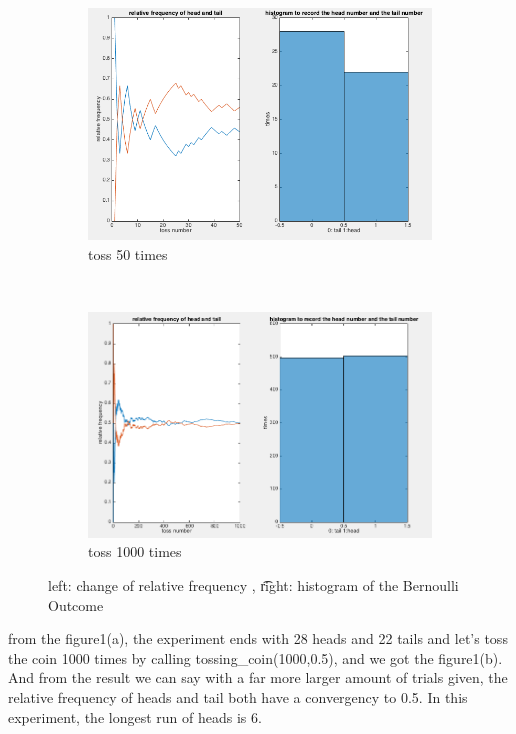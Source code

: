 \documentclass[twoside]{article}
\begin{document}
\begin{figure}[H]%
   \centering
   \begin{subfigure}[b]{0.47\textwidth}
   \includegraphics[width=\textwidth]{../data/exp1.png} 
   \caption{toss 50 times}
   \end{subfigure}
   ~
   \begin{subfigure}[b]{0.47\textwidth}
   \includegraphics[width=\textwidth ]{../data/exp1_e.png} 
   \caption{toss 1000 times}
   \end{subfigure}


   \caption{left: change of relative frequency , \t right: histogram of the Bernoulli Outcome}
\end{figure}
from the figure1(a), the experiment ends with 28 heads and 22 tails and let's toss the coin 1000 times by calling tossing\_coin(1000,0.5), and we got the figure1(b). And from the result we can say with a far more larger amount of trials given, the relative frequency of heads and tail both have a convergency to 0.5. In this experiment, the longest run of heads is 6.\\ \\
\end{document}
